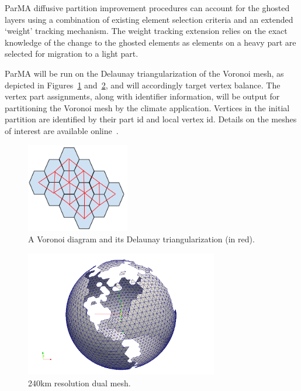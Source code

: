 \documentclass[a4paper]{article}
\begin{document}
ParMA diffusive partition improvement procedures can account for the ghosted
layers using a combination of existing element selection criteria and an
extended `weight' tracking mechanism.
The weight tracking extension relies on the exact knowledge of the change to the
ghosted elements as elements on a heavy part are selected for migration to a
light part.

ParMA will be run on the Delaunay triangularization of the Voronoi mesh, as
depicted in Figures~\ref{fig:delaunay} and~\ref{fig:NA240}, and will
accordingly target vertex balance.
The vertex part assignments, along with identifier information, will be output
for partitioning the Voronoi mesh by the climate application.
Vertices in the initial partition are identified by their part id and local
vertex id.
Details on the meshes of interest are available online~\cite{climateMesh}.

\begin{figure}
\centering
\includegraphics[width=0.4\textwidth]{ghostingOwnershipFig1.png}
\caption{\label{fig:delaunay} A Voronoi diagram and its Delaunay triangularization (in red).}
\end{figure}

\begin{figure}
\centering
\includegraphics[width=0.75\textwidth]{ocean_QU_240kmNA.png}
\caption{\label{fig:NA240} 240km resolution dual mesh.}
\end{figure}
\end{document}
